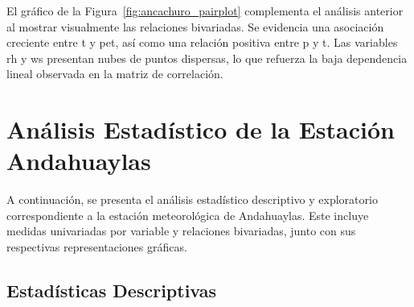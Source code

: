 El gráfico de la Figura~\ref{fig:ancachuro_pairplot} complementa el análisis anterior al mostrar visualmente las relaciones bivariadas. Se evidencia una asociación creciente entre \gls{t} y \gls{pet}, así como una relación positiva entre \gls{p} y \gls{t}. Las variables \gls{rh} y \gls{ws} presentan nubes de puntos dispersas, lo que refuerza la baja dependencia lineal observada en la matriz de correlación.



\section{Análisis Estadístico de la Estación Andahuaylas}

A continuación, se presenta el análisis estadístico descriptivo y exploratorio correspondiente a la estación meteorológica de Andahuaylas. Este incluye medidas univariadas por variable y relaciones bivariadas, junto con sus respectivas representaciones gráficas.

\subsection{Estadísticas Descriptivas}

